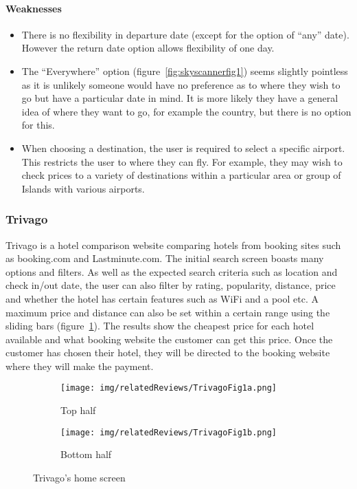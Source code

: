 \paragraph{Weaknesses}
\begin{itemize}
	\item There is no flexibility in departure date (except for the option of
		``any'' date). However the return date option allows flexibility of one
		day.
	\item The ``Everywhere'' option (figure~\ref{fig:skyscannerfig1}) seems
		slightly pointless as it is unlikely someone would have no preference
		as to where they wish to go but have a particular date in mind. It is
		more likely they have a general idea of where they want to go, for
		example the country, but there is no option for this.
	\item When choosing a destination, the user is required to select a
		specific airport. This restricts the user to where they can fly. For
		example, they may wish to check prices to a variety of destinations
		within a particular area or group of Islands with various airports.
\end{itemize}

\newpage

\subsubsection{Trivago}
\label{ssub:trivago}

Trivago is a hotel comparison website comparing hotels from booking sites such
as booking.com and Lastminute.com. The initial search screen boasts many
options and filters. As well as the expected search criteria such as location
and check in/out date, the user can also filter by rating, popularity,
distance, price and whether the hotel has certain features such as WiFi and a
pool etc. A maximum price and distance can also be set within a certain range
using the sliding bars (figure~\ref{fig:trivago1}). The results show the
cheapest price for each hotel available and what booking website the customer
can get this price. Once the customer has chosen their hotel, they will be
directed to the booking website where they will make the payment.
\begin{figure}[ht]
	\centering
	\begin{subfigure}[b]{0.2\textwidth}
		\texttt{[image: img/relatedReviews/TrivagoFig1a.png]}
		\caption{Top half}
	\end{subfigure}
	\qquad
	\begin{subfigure}[b]{0.2\textwidth}
		\texttt{[image: img/relatedReviews/TrivagoFig1b.png]}
		\caption{Bottom half}
	\end{subfigure}
	\caption{Trivago's home screen}\label{fig:trivago1}
\end{figure}

